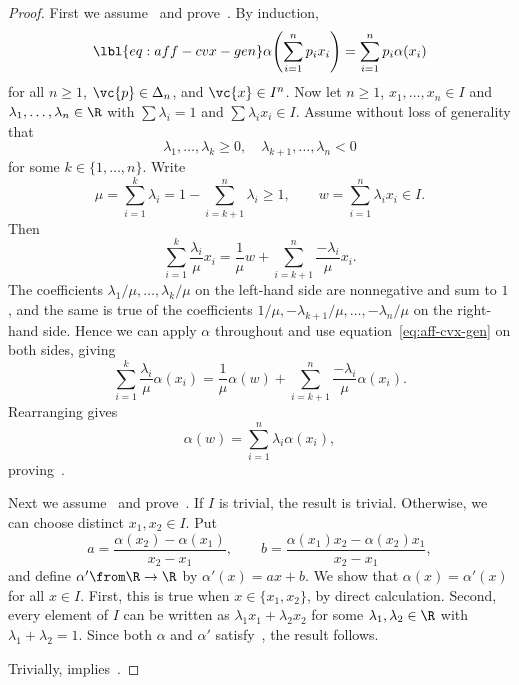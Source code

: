 \begin{proof}
First we assume~ and prove~.  By
induction,
% 
\begin{equation}
\lbl{eq:aff-cvx-gen}
\alpha \Biggl( \sum_{i = 1}^n p_i x_i \Biggr)
=
\sum_{i = 1}^n p_i \alpha(x_i)
\end{equation}
% 
for all $n \geq 1$, $\vc{p} \in \Delta_n$, and $\vc{x} \in I^n$.  Now let
$n \geq 1$, $x_1, \ldots, x_n \in I$ and $\lambda_1, \ldots, \lambda_n \in
\R$ with $\sum \lambda_i = 1$ and $\sum \lambda_i x_i \in I$.  Assume
without loss of generality that
\[
\lambda_1, \ldots, \lambda_k \geq 0,
\quad
\lambda_{k + 1}, \ldots, \lambda_n < 0
\]
for some $k \in \{1, \ldots, n\}$.  Write
\[
\mu 
=
\sum_{i = 1}^k \lambda_i
=
1 - \sum_{i = k + 1}^n \lambda_i
\geq 
1,
\qquad
w = \sum_{i = 1}^n \lambda_i x_i \in I.
\]
Then
\[
\sum_{i = 1}^k \frac{\lambda_i}{\mu} x_i
=
\frac{1}{\mu} w 
+ 
\sum_{i = k + 1}^n \frac{-\lambda_i}{\mu} x_i.
\]
The coefficients $\lambda_1/\mu, \ldots, \lambda_k/\mu$ on the left-hand
side are nonnegative and sum to $1$, and the same is true of the
coefficients $1/\mu, -\lambda_{k + 1}/\mu, \ldots, -\lambda_n/\mu$ on the
right-hand side.  Hence we can apply $\alpha$ throughout and use
equation~\eqref{eq:aff-cvx-gen} on both sides, giving
\[
\sum_{i = 1}^k \frac{\lambda_i}{\mu} \alpha(x_i)
=
\frac{1}{\mu} \alpha(w) 
+ 
\sum_{i = k + 1}^n \frac{-\lambda_i}{\mu} \alpha(x_i).
\]
Rearranging gives
\[
\alpha(w) 
=
\sum_{i = 1}^n \lambda_i \alpha(x_i),
\]
proving~.

Next we assume~ and prove~.  If
$I$ is trivial, the result is trivial.  Otherwise, we can choose distinct
$x_1, x_2 \in I$.  Put
\[
a = \frac{\alpha(x_2) - \alpha(x_1)}{x_2 - x_1},
\qquad
b = \frac{\alpha(x_1) x_2 - \alpha(x_2) x_1}{x_2 - x_1},
\]
and define $\alpha' \from \R \to \R$ by $\alpha'(x) = ax + b$.  We show
that $\alpha(x) = \alpha'(x)$ for all $x \in I$.  First, this is true when
$x \in \{x_1, x_2\}$, by direct calculation.  Second, every element of $I$
can be written as $\lambda_1 x_1 + \lambda_2 x_2$ for some $\lambda_1,
\lambda_2 \in \R$ with $\lambda_1 + \lambda_2 = 1$.  Since both $\alpha$
and $\alpha'$ satisfy~, the result follows.

Trivially,  implies~.


\end{proof}
